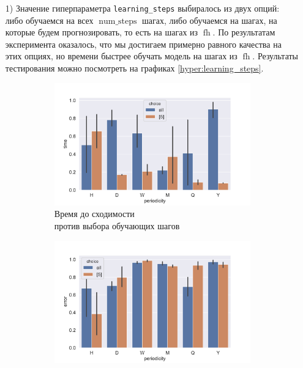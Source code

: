 \documentclass[a4paper,14pt]{extarticle}
\begin{document}
	\begin{enumerate}
		\item[1)] Значение гиперпараметра \texttt{learning\_steps} выбиралось из двух опций: либо обучаемся на всех $\operatorname{num\_steps}$ шагах, либо обучаемся на шагах, на которые будем прогнозировать, то есть на шагах из $\operatorname{fh}$. По результатам эксперимента оказалось, что мы достигаем примерно равного качества на этих опциях, но времени быстрее обучать модель на шагах из $\operatorname{fh}$. Результаты тестирования можно посмотреть на графиках \ref{hyper:learning_steps}.
		\begin{figure}[!h]
			\captionsetup{justification=centering}
			\begin{subfigure}[b]{.5\linewidth}
				\centering
				\includegraphics[width=\linewidth]{pictures/hyper-learning_steps-time.pdf}
				\caption{Время до сходимости \\ против выбора обучающих шагов}
				\label{hyper:learning_steps:time}
			\end{subfigure}%
			\begin{subfigure}[b]{.5\linewidth}
				\centering
				\includegraphics[width=\linewidth]{pictures/hyper-learning_steps-mse.pdf}

\end{subfigure}
\end{figure}
\end{enumerate}
\end{document}

